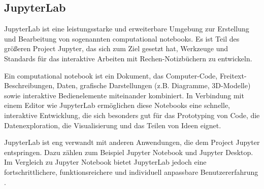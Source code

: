 \subsection{JupyterLab}
JupyterLab ist eine leistungsstarke und erweiterbare Umgebung zur Erstellung und Bearbeitung von sogenannten computational notebooks.
Es ist Teil des größeren Project Jupyter, das sich zum Ziel gesetzt hat, Werkzeuge und Standards für das interaktive Arbeiten mit Rechen-Notizbüchern zu entwickeln.

Ein computational notebook ist ein Dokument, das Computer-Code, Frei\-text-Be\-schrei\-bun\-gen, Daten,
grafische Darstellungen (z.B. Diagramme, 3D-Modelle) sowie interaktive Bedienelemente miteinander kombiniert.
In Verbindung mit einem Editor wie JupyterLab ermöglichen diese Notebooks eine schnelle, interaktive Entwicklung,
die sich besonders gut für das Prototyping von Code, die Datenexploration, die Visualisierung und das Teilen von Ideen eignet.

JupyterLab ist eng verwandt mit anderen Anwendungen, die dem Project Jupyter entspringen.
Dazu zählen zum Beispiel Jupyter Notebook und Jupyter Desktop. Im Vergleich zu Jupyter Notebook bietet JupyterLab jedoch eine fortschrittlichere,
funktionsreichere und individuell anpassbare Benutzererfahrung .